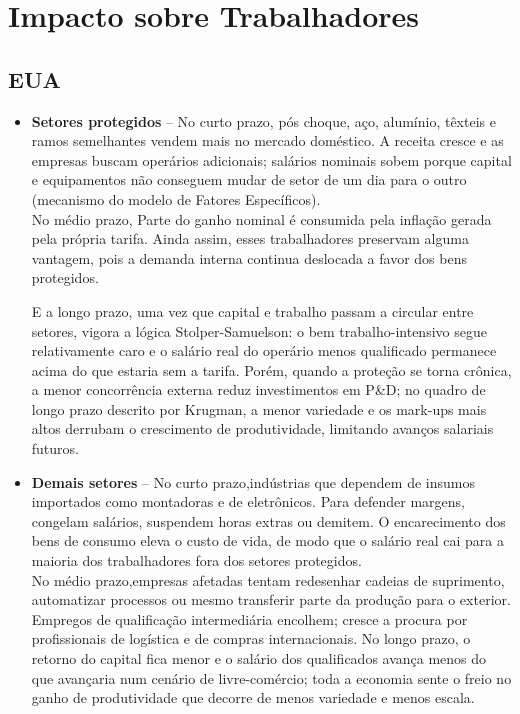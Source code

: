 \documentclass[a4paper,12pt]{article}[abntex2]
\begin{document}
\section*{\textbf{Impacto sobre Trabalhadores}}

\subsection*{\textbf{EUA}}

\begin{itemize}
  \item \textbf{Setores protegidos} –  No curto prazo, pós choque, aço, alumínio, têxteis e ramos semelhantes vendem mais no mercado doméstico. A receita cresce e as empresas buscam operários adicionais; salários nominais sobem porque capital e equipamentos não conseguem mudar de setor de um dia para o outro (mecanismo do modelo de Fatores Específicos).\\
  No médio prazo, Parte do ganho nominal é consumida pela inflação gerada pela própria tarifa. Ainda assim, esses trabalhadores preservam alguma vantagem, pois a demanda interna continua deslocada a favor dos bens protegidos.
  
  E a longo prazo, uma vez que capital e trabalho passam a circular entre setores, vigora a lógica Stolper-Samuelson: o bem trabalho-intensivo segue relativamente caro e o salário real do operário menos qualificado permanece acima do que estaria sem a tarifa. Porém, quando a proteção se torna crônica, a menor concorrência externa reduz investimentos em P\&D; no quadro de longo prazo descrito por Krugman, a menor variedade e os mark-ups mais altos derrubam o crescimento de produtividade, limitando avanços salariais futuros.
  
  \item \textbf{Demais setores} – No curto prazo,indústrias que dependem de insumos importados como montadoras e de eletrônicos. Para defender margens, congelam salários, suspendem horas extras ou demitem. O encarecimento dos bens de consumo eleva o custo de vida, de modo que o salário real cai para a maioria dos trabalhadores fora dos setores protegidos.\\
  No médio prazo,empresas afetadas tentam redesenhar cadeias de suprimento, automatizar processos ou mesmo transferir parte da produção para o exterior. Empregos de qualificação intermediária encolhem; cresce a procura por profissionais de logística e de compras internacionais.
  No longo prazo, o retorno do capital fica menor e o salário dos qualificados avança menos do que avançaria num cenário de livre-comércio; toda a economia sente o freio no ganho de produtividade que decorre de menos variedade e menos escala.

\end{itemize}
\end{document}

